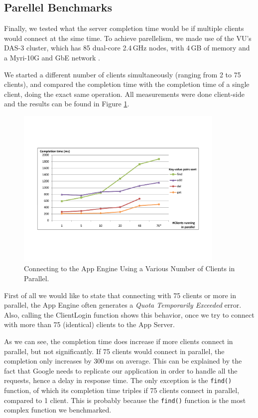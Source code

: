 \subsection{Parellel Benchmarks}
Finally, we tested what the server completion time would be if multiple clients
would connect at the sime time. To achieve parellelism, we made use of the VU's DAS-3
cluster, which has 85 dual-core 2.4\,GHz nodes, with 4\,GB of memory and a
Myri-10G and GbE network \cite{das3-www}.

We started a different number of clients simultaneously (ranging from 2 to 75
clients), and compared the completion time with the completion time of a single
client, doing the exact same operation. All measurements were done client-side
and the results can be found in Figure \ref{benchmarks-parallel-fig}.

\begin{figure} %
\begin{center}
\includegraphics[trim=5cm 4cm 5cm 5cm,width=10cm]{./figures/parallel.pdf}
\caption{Connecting to the App Engine Using a Various Number of Clients in
Parallel. \label{benchmarks-parallel-fig}}
\end{center}
\end{figure}

First of all we would like to state that connecting with 75 clients or more in
parallel, the App Engine often generates a \emph{Quota Temporarily Exceeded}
error. Also, calling the ClientLogin function shows this behavior, once we try
to connect with more than 75 (identical) clients to the App Server. 

As we can see, the completion time does increase if more clients connect in
parallel, but not significantly. If 75 clients would connect in parallel, the
completion only increases by 300\,ms on average. This can be explained by the
fact that Google needs to replicate our application in order to handle all the
requests, hence a delay in response time. The only exception is the
\texttt{find()} function, of which its completion time triples if 75 clients
connect in parallel, compared to 1 client. This is probably because the
\texttt{find()} function is the most complex function we benchmarked.

